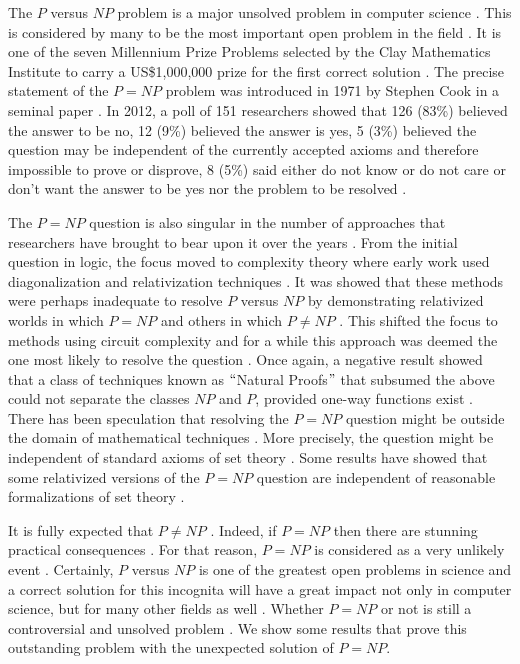 \documentclass[a4paper,UKenglish,cleveref, autoref]{lipics-v2019}
\begin{document}
The $P$ versus $NP$ problem is a major unsolved problem in computer science \cite{CS00}. This is considered by many to be the most important open problem in the field \cite{CS00}. It is one of the seven Millennium Prize Problems selected by the Clay Mathematics Institute to carry a US\$1,000,000 prize for the first correct solution \cite{CS00}. The precise statement of the $P=NP$ problem was introduced in 1971 by Stephen Cook in a seminal paper \cite{CS00}. In 2012, a poll of 151 researchers showed that 126 (83\%) believed the answer to be no, 12 (9\%) believed the answer is yes, 5 (3\%) believed the question may be independent of the currently accepted axioms and therefore impossible to prove or disprove, 8 (5\%) said either do not know or do not care or don't want the answer to be yes nor the problem to be resolved \cite{GA12}.

The $P = NP$ question is also singular in the number of approaches that researchers have brought to bear upon it over the years \cite{DEO10}. From the initial question in logic, the focus moved to complexity theory where early work used diagonalization and relativization techniques \cite{DEO10}. It was showed that these methods were perhaps inadequate to resolve $P$ versus $NP$ by demonstrating relativized worlds in which $P = NP$ and others in which $P \neq NP$ \cite{BA75}. This shifted the focus to methods using circuit complexity and for a while this approach was deemed the one most likely to resolve the question \cite{DEO10}. Once again, a negative result showed that a class of techniques known as $``$Natural Proofs$"$ that subsumed the above could not separate the classes $NP$ and $P$, provided one-way functions exist \cite{RAZ97}. There has been speculation that resolving the $P = NP$ question might be outside the domain of mathematical techniques \cite{DEO10}. More precisely, the question might be independent of standard axioms of set theory \cite{DEO10}. Some results have showed that some relativized versions of the $P = NP$ question are independent of reasonable formalizations of set theory \cite{HOP76}.

It is fully expected that $P \neq NP$ \cite{Pap03}. Indeed, if $P = NP$ then there are stunning practical consequences \cite{Pap03}. For that reason, $P = NP$ is considered as a very unlikely event \cite{Pap03}. Certainly, $P$ versus $NP$ is one of the greatest open problems in science and a correct solution for this incognita will have a great impact not only in computer science, but for many other fields as well \cite{AS17}. Whether $P = NP$ or not is still a controversial and unsolved problem \cite{AS17}. We show some results that prove this outstanding problem with the unexpected solution of $P = NP$.
\end{document}
